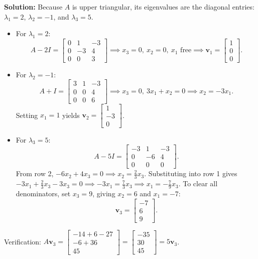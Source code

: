 \documentclass[11pt, letterpaper]{article}
\theoremstyle{definition}
\theoremstyle{remark}
\begin{document}
\textbf{Solution:}
Because $A$ is upper triangular, its eigenvalues are the diagonal entries: $\lambda_{1} = 2$, $\lambda_{2} = -1$, and $\lambda_{3} = 5$.
\begin{itemize}
    \item For $\lambda_{1} = 2$:
    \[
    A - 2I = \begin{bmatrix} 0 & 1 & -3 \\ 0 & -3 & 4 \\ 0 & 0 & 3 \end{bmatrix} \implies x_{3} = 0,\ x_{2} = 0,\ x_{1} \text{ free} \implies \mathbf{v}_{1} = \begin{bmatrix} 1 \\ 0 \\ 0 \end{bmatrix}.
    \]
    \item For $\lambda_{2} = -1$:
    \[
    A + I = \begin{bmatrix} 3 & 1 & -3 \\ 0 & 0 & 4 \\ 0 & 0 & 6 \end{bmatrix} \implies x_{3} = 0,\ 3x_{1} + x_{2} = 0 \implies x_{2} = -3x_{1}.
    \]
    Setting $x_{1} = 1$ yields $\mathbf{v}_{2} = \begin{bmatrix} 1 \\ -3 \\ 0 \end{bmatrix}$.
    \item For $\lambda_{3} = 5$:
    \[
    A - 5I = \begin{bmatrix} -3 & 1 & -3 \\ 0 & -6 & 4 \\ 0 & 0 & 0 \end{bmatrix}.
    \]
    From row 2, $-6x_{2} + 4x_{3} = 0 \implies x_{2} = \frac{2}{3}x_{3}$. Substituting into row 1 gives $-3x_{1} + \frac{2}{3}x_{3} - 3x_{3} = 0 \implies -3x_{1} = \frac{7}{3}x_{3} \implies x_{1} = -\frac{7}{9}x_{3}$. To clear all denominators, set $x_{3} = 9$, giving $x_{2} = 6$ and $x_{1} = -7$:
    \[
    \mathbf{v}_{3} = \begin{bmatrix} -7 \\ 6 \\ 9 \end{bmatrix}.
    \]
\end{itemize}
Verification: $A\mathbf{v}_{3} = \begin{bmatrix} -14 + 6 - 27 \\ -6 + 36 \\ 45 \end{bmatrix} = \begin{bmatrix} -35 \\ 30 \\ 45 \end{bmatrix} = 5\mathbf{v}_{3}$.
\end{document}
